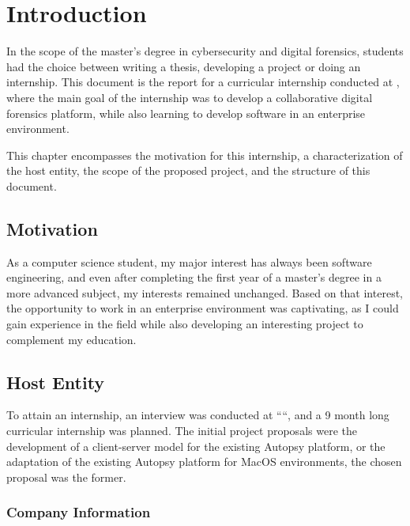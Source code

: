 
\chapter{Introduction}
\label{ch:introduction}

In the scope of the master's degree in cybersecurity and digital forensics, students had the choice between writing a thesis, developing a project or doing an internship.
This document is the report for a curricular internship conducted at \company, where the main goal of the internship was to develop a collaborative digital forensics platform,
while also learning to develop software in an enterprise environment.

This chapter encompasses the motivation for this internship, a characterization of the host entity, the scope of the proposed project, and the structure of this document.

\section{Motivation}

As a computer science student, my major interest has always been software engineering, and even after completing the first year of a master's degree in a more advanced subject, 
my interests remained unchanged. Based on that interest, the opportunity to work in an enterprise environment was captivating, as I could gain experience in the 
field while also developing an interesting project to complement my education.

\section{Host Entity}

To attain an internship, an interview was conducted at ``\company``, and a 9 month long curricular internship was planned. The initial project proposals were the development of a 
client-server model for the existing Autopsy platform, or the adaptation of the existing Autopsy platform for MacOS environments, the chosen proposal was the former.

\subsection{Company Information}

